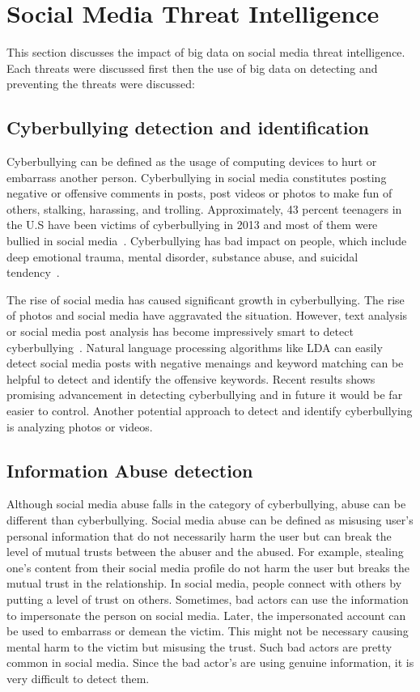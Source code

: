 \documentclass[sigconf]{acmart}
\begin{document}
\section{Social Media Threat Intelligence}
This section discusses the impact of big data on social media threat intelligence. Each threats were discussed first then the use of big data on detecting and preventing the threats were discussed:

\subsection{Cyberbullying detection and identification}
Cyberbullying can be defined as the usage of computing devices to hurt or embarrass another person.  Cyberbullying in social media constitutes posting negative or offensive comments in posts, post videos or photos to make fun of others,  stalking, harassing, and trolling.  Approximately, 43 percent teenagers in the U.S have been victims of cyberbullying in 2013 and most of them were bullied in social media~\cite{cyberbullying}. Cyberbullying has bad impact on people, which include deep emotional trauma, mental disorder, substance abuse, and suicidal tendency~\cite{cb-effect}. 

The rise of social media has caused significant growth in cyberbullying. The rise of photos and social media have aggravated the situation. However, text analysis or social media post analysis has become impressively smart to detect cyberbullying~\cite{HosseinmardiMRH15}. Natural language processing algorithms like LDA can easily detect social media posts with negative menaings and keyword matching can be helpful to detect and identify the offensive keywords. Recent results shows promising advancement in detecting cyberbullying and in future it would be far easier to control. Another potential approach to detect and identify cyberbullying is analyzing photos or videos.

\subsection{Information Abuse detection}
Although social media abuse falls in the category of cyberbullying, abuse can be different than cyberbullying. Social media abuse can be defined as misusing user's personal information that do not necessarily harm the user but can break the level of mutual trusts between the abuser and the abused. For example, stealing one's content from their social media profile do not harm the user but breaks the mutual trust in the relationship. In social media, people connect with others by putting a level of trust on others. Sometimes, bad actors can use the information to impersonate the person on social media. Later, the impersonated account can be used to embarrass or demean the victim. This might not be necessary causing mental harm to the victim but misusing the trust. Such bad actors are pretty common in social media. Since the bad actor's are using genuine information, it is very difficult to detect them.
\end{document}
